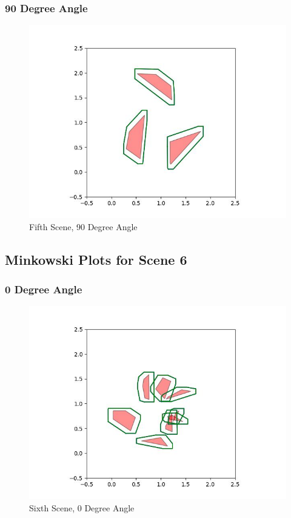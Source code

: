 \documentclass{article}
\begin{document}
\newpage
\subsubsection{90 Degree Angle}
\begin{figure}[h!]
	\includegraphics[width= 0.9 \linewidth]{Problem3_minkowski5_90.jpg}
	\centering
	\caption{Fifth Scene, 90 Degree Angle}
	\label{Problem3_minkowski5_90.jpg}
\end{figure}

\newpage
\subsection{Minkowski Plots for Scene 6}
\subsubsection{0 Degree Angle}
\begin{figure}[h!]
	\includegraphics[width= 0.9 \linewidth]{Problem3_minkowski6_0.jpg}
	\centering
	\caption{Sixth Scene, 0 Degree Angle}
	\label{Problem3_minkowski6_0.jpg}
\end{figure}
\end{document}
